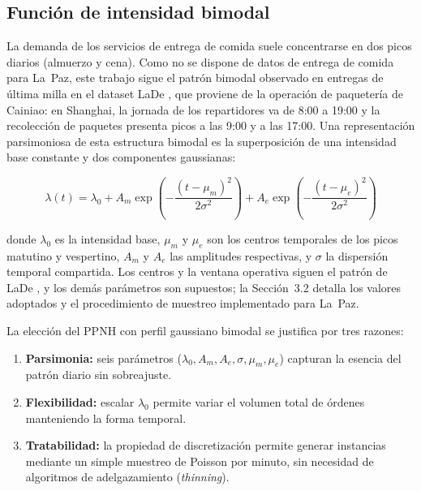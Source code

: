 \documentclass[12pt,letterpaper,oneside]{book}
\begin{document}
	\subsection{Función de intensidad bimodal}

	La demanda de los servicios de entrega de comida suele concentrarse en
	dos picos diarios (almuerzo y cena).  Como no se dispone de datos de
	entrega de comida para La~Paz, este trabajo sigue el patrón bimodal
	observado en entregas de última milla en el dataset LaDe \citep{Wu2023LaDe},
	que proviene de la operación de paquetería de Cainiao: en Shanghai, la
	jornada de los repartidores va de 8:00 a 19:00 y la recolección de
	paquetes presenta picos a las 9:00 y a las 17:00.  Una representación parsimoniosa de esta estructura
	bimodal es la superposición de una intensidad base constante y dos
	componentes gaussianas:

	\begin{equation}
		\lambda(t) = \lambda_0
		+ A_m \exp\!\left(-\frac{(t - \mu_m)^2}{2\sigma^2}\right)
		+ A_e \exp\!\left(-\frac{(t - \mu_e)^2}{2\sigma^2}\right)
		\label{eq:intensity_theory}
	\end{equation}

	\noindent donde $\lambda_0$ es la intensidad base, $\mu_m$ y $\mu_e$
	son los centros temporales de los picos matutino y vespertino,
	$A_m$ y $A_e$ las amplitudes respectivas, y $\sigma$ la dispersión
	temporal compartida.  Los centros y la ventana operativa siguen el
	patrón de LaDe \citep{Wu2023LaDe}, y los demás parámetros son supuestos; la Sección~3.2 detalla
	los valores adoptados y el procedimiento de muestreo implementado para La~Paz.

	La elección del PPNH con perfil gaussiano bimodal se justifica por tres
	razones:
	\begin{enumerate}
		\item \textbf{Parsimonia:} seis parámetros
		      ($\lambda_0, A_m, A_e, \sigma, \mu_m, \mu_e$) capturan la
		      esencia del patrón diario sin sobreajuste.
		\item \textbf{Flexibilidad:} escalar $\lambda_0$ permite variar el
		      volumen total de órdenes manteniendo la forma temporal.
		\item \textbf{Tratabilidad:} la propiedad de discretización permite
		      generar instancias mediante un simple muestreo de Poisson por
		      minuto, sin necesidad de algoritmos de adelgazamiento
		      (\textit{thinning}).
	\end{enumerate}
\end{document}
